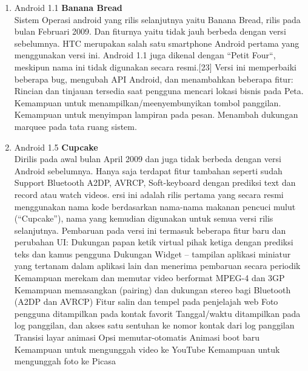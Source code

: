 \begin{enumerate}
\item Android 1.1 \textbf{Banana Bread}\\
Sistem Operasi android yang rilis selanjutnya yaitu Banana Bread, rilis pada bulan Februari 2009. Dan fiturnya yaitu tidak jauh berbeda dengan versi sebelumnya. HTC merupakan salah satu smartphone Android pertama yang menggunakan versi ini. Android 1.1 juga dikenal dengan “Petit Four“, meskipun nama ini tidak digunakan secara resmi.[23] Versi ini memperbaiki beberapa bug, mengubah API Android, dan menambahkan beberapa fitur:
Rincian dan tinjauan tersedia saat pengguna mencari lokasi bisnis pada Peta.
Kemampuan untuk menampilkan/meenyembunyikan tombol panggilan.
Kemampuan untuk menyimpan lampiran pada pesan.
Menambah dukungan marquee pada tata ruang sistem.



\item Android 1.5 \textbf{Cupcake}\\
Dirilis pada awal bulan April 2009 dan juga tidak berbeda dengan versi Android sebelumnya. Hanya saja terdapat fitur tambahan seperti sudah Support Bluetooth A2DP, AVRCP, Soft-keyboard dengan prediksi text dan record atau watch videos. ersi ini adalah rilis pertama yang secara resmi menggunakan nama kode berdasarkan nama-nama makanan pencuci mulut (“Cupcake”), nama yang kemudian digunakan untuk semua versi rilis selanjutnya. Pembaruan pada versi ini termasuk beberapa fitur baru dan perubahan UI:
Dukungan papan ketik virtual pihak ketiga dengan prediksi teks dan kamus pengguna
Dukungan Widget – tampilan aplikasi miniatur yang tertanam dalam aplikasi lain dan menerima pembaruan secara periodik
Kemampuan merekam dan memutar video berformat MPEG-4 dan 3GP
Kemampuan memasangkan (pairing) dan dukungan stereo bagi Bluetooth (A2DP dan AVRCP)
Fitur salin dan tempel pada penjelajah web
Foto pengguna ditampilkan pada kontak favorit
Tanggal/waktu ditampilkan pada log panggilan, dan akses satu sentuhan ke nomor kontak dari log panggilan
Transisi layar animasi
Opsi memutar-otomatis
Animasi boot baru
Kemampuan untuk mengunggah video ke YouTube
Kemampuan untuk mengunggah foto ke Picasa




\end{enumerate}
